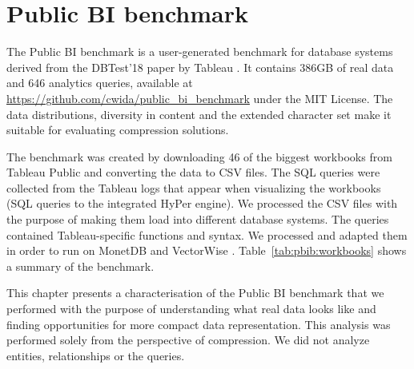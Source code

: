 
\chapter{Public BI benchmark} %
\label{ch:pbib}


\graphicspath{{3_pbib/images/}}

% 

The Public BI benchmark \cite{pbib} is a user-generated benchmark for database systems derived from the DBTest'18 paper by Tableau \cite{vogelsgesang2018get}. It contains 386GB of real data and 646 analytics queries, available at \url{https://github.com/cwida/public_bi_benchmark} under the MIT License. The data distributions, diversity in content and the extended character set make it suitable for evaluating compression solutions.

The benchmark was created by downloading 46 of the biggest workbooks from Tableau Public \cite{tableaupublic} and converting the data to CSV files. The SQL queries were collected from the Tableau logs that appear when visualizing the workbooks (SQL queries to the integrated HyPer \cite{kemper2011hyper} engine). We processed the CSV files with the purpose of making them load into different database systems. The queries contained Tableau-specific functions and syntax. We processed and adapted them in order to run on MonetDB \cite{boncz2005monetdb} and VectorWise \cite{zukowski2012vectorwise}. Table~\ref{tab:pbib:workbooks} shows a summary of the benchmark.


This chapter presents a characterisation of the Public BI benchmark that we performed with the purpose of understanding what real data looks like and finding opportunities for more compact data representation. This analysis was performed solely from the perspective of compression. We did not analyze entities, relationships or the queries.


\FloatBarrier

